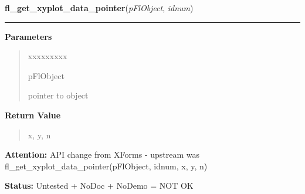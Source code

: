 \hspace{.8\funcindent}\begin{boxedminipage}{\funcwidth}

    \raggedright \textbf{fl\_get\_xyplot\_data\_pointer}(\textit{pFlObject}, \textit{idnum})

    \vspace{-1.5ex}

    \rule{\textwidth}{0.5\fboxrule}
\setlength{\parskip}{2ex}
\setlength{\parskip}{1ex}
      \textbf{Parameters}
      \vspace{-1ex}

      \begin{quote}
        \begin{Ventry}{xxxxxxxxx}

          \item[pFlObject]

          pointer to object

        \end{Ventry}

      \end{quote}

      \textbf{Return Value}
    \vspace{-1ex}

      \begin{quote}
      x, y, n

      \end{quote}

\textbf{Attention:} API change from XForms - upstream was 
fl\_get\_xyplot\_data\_pointer(pFlObject, idnum, x, y, n)



\textbf{Status:} Untested + NoDoc + NoDemo = NOT OK



    \end{boxedminipage}

    \label{xformslib:flxyplot:fl_get_xyplot_overlay_data}

    \vspace{0.5ex}

